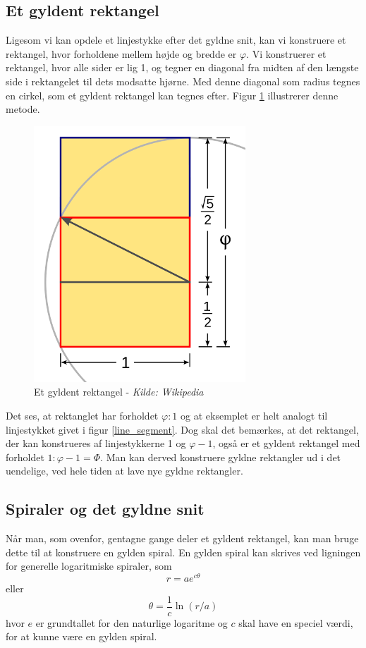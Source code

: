 {\subsection{Et gyldent rektangel}
Ligesom vi kan opdele et linjestykke efter det gyldne snit,
kan vi konstruere et rektangel, hvor forholdene mellem højde og bredde er
$\varphi$. Vi konstruerer et rektangel, hvor alle sider er lig 1, og
tegner en diagonal fra midten af den længste side i rektangelet til dets modsatte hjørne. Med
denne diagonal som radius tegnes en cirkel, som et gyldent rektangel kan
tegnes efter. Figur \ref{golden_rectangle} illustrerer denne metode.

\begin{figure}[t]
	\centering
	\includegraphics[scale=0.35,angle=0]{afsnit/baggrund/billeder/Golden_Rectangle_Construction}
	\caption[Et gyldent rektangel]{Et gyldent rektangel - \emph{Kilde: Wikipedia}}
	\label{golden_rectangle}
\end{figure}

Det ses, at rektanglet har forholdet $\varphi:1$ og at eksemplet er helt
analogt til linjestykket givet i figur \ref{line_segment}. Dog skal
det bemærkes, at det rektangel, der kan konstrueres af linjestykkerne 1
og $\varphi - 1$, også er et gyldent rektangel med forholdet $1:\varphi
-1 = \varPhi$. Man kan derved konstruere gyldne rektangler ud i det
uendelige, ved hele tiden at lave nye gyldne rektangler.

\subsection{Spiraler og det gyldne snit}
Når man, som ovenfor, gentagne gange deler et gyldent rektangel, kan man
bruge dette til at konstruere en gylden spiral. En gylden spiral kan
skrives ved ligningen for generelle logaritmiske spiraler, som
\begin{equation}
	r = ae^{c\theta}
	\label{log_spiral_2}
\end{equation}
eller
\begin{equation}
	\theta = \frac{1}{c}\ln(r/a)
	\label{log_spiral_1}
\end{equation}
hvor $e$ er grundtallet for den naturlige logaritme og $c$ skal have en
speciel værdi, for at kunne være en gylden spiral.

}
